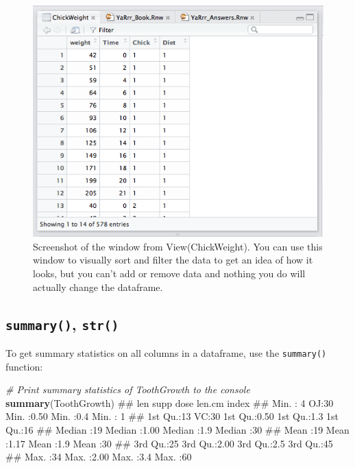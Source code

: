 \documentclass[]{book}
\newenvironment{Shaded}{\begin{snugshade}}{\end{snugshade}}
\newcommand{\KeywordTok}[1]{\textcolor[rgb]{0.13,0.29,0.53}{\textbf{{#1}}}}
\newcommand{\CommentTok}[1]{\textcolor[rgb]{0.56,0.35,0.01}{\textit{{#1}}}}
\newcommand{\NormalTok}[1]{{#1}}
\theoremstyle{definition}
\theoremstyle{definition}
\theoremstyle{remark}
\begin{document}
\begin{figure}

{\centering \includegraphics[width=500px]{images/chickweightscreenshot} 

}

\caption{Screenshot of the window from View(ChickWeight). You can use this window to visually sort and filter the data to get an idea of how it looks, but you can't add or remove data and nothing you do will actually change the dataframe.}\label{fig:viewchicks}
\end{figure}

\subsection{\texorpdfstring{\texttt{summary()},
\texttt{str()}}{summary(), str()}}\label{summary-str}

To get summary statistics on all columns in a dataframe, use the
\texttt{summary()} function:

\begin{Shaded}
\begin{Highlighting}[]
\CommentTok{# Print summary statistics of ToothGrowth to the console}
\KeywordTok{summary}\NormalTok{(ToothGrowth)}
\NormalTok{##       len     supp         dose          len.cm        index   }
\NormalTok{##  Min.   : 4   OJ:30   Min.   :0.50   Min.   :0.4   Min.   : 1  }
\NormalTok{##  1st Qu.:13   VC:30   1st Qu.:0.50   1st Qu.:1.3   1st Qu.:16  }
\NormalTok{##  Median :19           Median :1.00   Median :1.9   Median :30  }
\NormalTok{##  Mean   :19           Mean   :1.17   Mean   :1.9   Mean   :30  }
\NormalTok{##  3rd Qu.:25           3rd Qu.:2.00   3rd Qu.:2.5   3rd Qu.:45  }
\NormalTok{##  Max.   :34           Max.   :2.00   Max.   :3.4   Max.   :60}
\end{Highlighting}
\end{Shaded}
\end{document}
